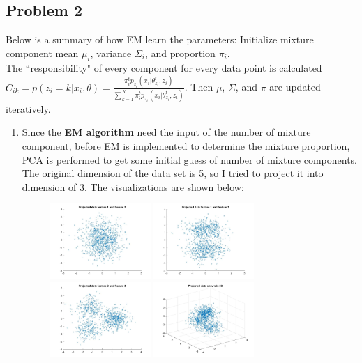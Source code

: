 \documentclass[a4paper]{article}
\begin{document}
\begin{spacing}{2.0}
\section*{\huge\textbf{ Problem \uppercase\expandafter{2} }  }
\normalsize
Below is a summary of how EM learn the parameters:
Initialize mixture component mean $\mu_i$, variance $\Sigma_i$, and proportion $\pi_i$.\\
The ``responsibility" of every component for every data point is calculated $C_{ik} = p(z_i = k|x_i, \theta) = \displaystyle\frac{\pi_i^tp_{z_i}(x_i|\theta_{z_i}^t, z_i)}{\sum_{k=1}^K\pi_i^tp_{z_i}(x_i|\theta_{z_i}^t, z_i)}$. 
Then $\mu$, $\Sigma$, and $\pi$ are updated iteratively. 
\noindent
\begin{enumerate}[(1)]
\item Since the \textbf{EM algorithm} need the input of the number of mixture component, before EM is implemented to determine the mixture proportion, PCA is performed to get some initial guess of number of mixture components. The original dimension of the data set is 5, so I tried to project it into dimension of 3. The visualizations are shown below:
\begin{figure}[H]
\centering
\includegraphics[width = 1.5in]{p1and2.jpg}
\includegraphics[width = 1.5in]{p1and3.jpg}
\includegraphics[width = 1.5in]{p2and3.jpg}
\includegraphics[width = 1.5in]{p3d.jpg}

\end{figure}
\end{enumerate}
\end{spacing}
\end{document}
